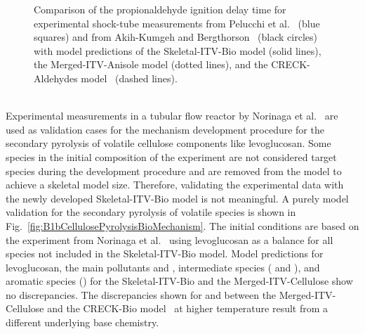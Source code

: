 \begin{refsection}
\begin{figure}[h]
  \hfill
  \hfill
  \caption{Comparison of the propionaldehyde ignition delay time for experimental shock-tube measurements from Pelucchi et al.~\cite{Pelucchi2015} (blue squares) and from Akih-Kumgeh and Bergthorson~\cite{AkihKumgeh2011} (black circles) with model predictions of the Skeletal-ITV-Bio model (solid lines), the Merged-ITV-Anisole model (dotted lines), and the CRECK-Aldehydes model~\cite{Pelucchi2015} (dashed lines).}
  \label{fig:B1bIDTPropionaldehydeBioMechanism}
\end{figure}
\\
Experimental measurements in a tubular flow reactor by Norinaga et al.~\cite{Norinaga2013} are used as validation cases for the mechanism development procedure for the secondary pyrolysis of volatile cellulose components like levoglucosan. Some species in the initial composition of the experiment are not considered target species during the development procedure and are removed from the model to achieve a skeletal model size. Therefore, validating the experimental data with the newly developed Skeletal-ITV-Bio model is not meaningful. A purely model validation for the secondary pyrolysis of volatile species is shown in Fig.~\ref{fig:B1bCellulosePyrolysisBioMechanism}. The initial conditions are based on the experiment from Norinaga et al.~\cite{Norinaga2013} using levoglucosan as a balance for all species not included in the Skeletal-ITV-Bio model. Model predictions for levoglucosan, the main pollutants  and , intermediate species ( and ), and aromatic species () for the Skeletal-ITV-Bio and the Merged-ITV-Cellulose show no discrepancies. The discrepancies shown for  and  between the Merged-ITV-Cellulose and the CRECK-Bio model~\cite{Debiagi2016} at higher temperature result from a different underlying base chemistry.
\begin{figure}[h]
  \centering
  \hfill
  \hfill
  \hfill

\end{figure}
\end{refsection}
